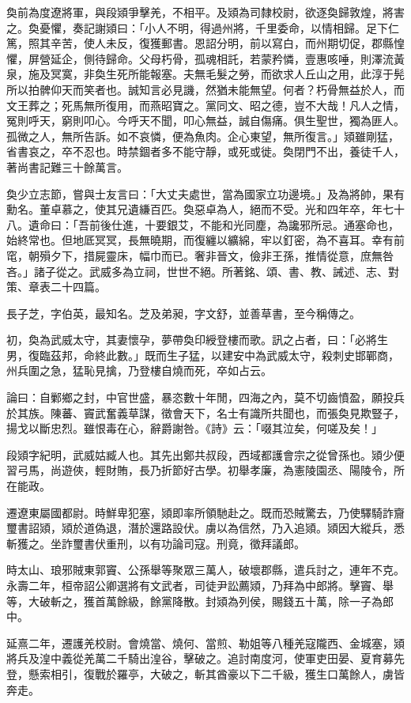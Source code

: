 \begin{pinyinscope}
奐前為度遼將軍，與段熲爭擊羌，不相平。及熲為司隸校尉，欲逐奐歸敦煌，將害之。奐憂懼，奏記謝熲曰：「小人不明，得過州將，千里委命，以情相歸。足下仁篤，照其辛苦，使人未反，復獲郵書。恩詔分明，前以寫白，而州期切促，郡縣惶懼，屏營延企，側待歸命。父母朽骨，孤魂相託，若蒙矜憐，壹惠咳唾，則澤流黃泉，施及冥寞，非奐生死所能報塞。夫無毛髮之勞，而欲求人丘山之用，此淳于髡所以拍髀仰天而笑者也。誠知言必見譏，然猶未能無望。何者？朽骨無益於人，而文王葬之；死馬無所復用，而燕昭寶之。黨同文、昭之德，豈不大哉！凡人之情，冤則呼天，窮則叩心。今呼天不聞，叩心無益，誠自傷痛。俱生聖世，獨為匪人。孤微之人，無所告訴。如不哀憐，便為魚肉。企心東望，無所復言。」熲雖剛猛，省書哀之，卒不忍也。時禁錮者多不能守靜，或死或徙。奐閉門不出，養徒千人，著尚書記難三十餘萬言。

奐少立志節，嘗與士友言曰：「大丈夫處世，當為國家立功邊境。」及為將帥，果有勳名。董卓慕之，使其兄遺縑百匹。奐惡卓為人，絕而不受。光和四年卒，年七十八。遺命曰：「吾前後仕進，十要銀艾，不能和光同塵，為讒邪所忌。通塞命也，始終常也。但地厎冥冥，長無曉期，而復纏以纊綿，牢以釘密，為不喜耳。幸有前窀，朝殞夕下，措屍靈床，幅巾而已。奢非晉文，儉非王孫，推情從意，庶無咎吝。」諸子從之。武威多為立祠，世世不絕。所著銘、頌、書、教、誡述、志、對策、章表二十四篇。

長子芝，字伯英，最知名。芝及弟昶，字文舒，並善草書，至今稱傳之。

初，奐為武威太守，其妻懷孕，夢帶奐印綬登樓而歌。訊之占者，曰：「必將生男，復臨茲邦，命終此數。」既而生子猛，以建安中為武威太守，殺刺史邯鄲商，州兵圍之急，猛恥見擒，乃登樓自燒而死，卒如占云。

論曰：自鄛鄉之封，中官世盛，暴恣數十年閒，四海之內，莫不切齒憤盈，願投兵於其族。陳蕃、竇武奮義草謀，徵會天下，名士有識所共聞也，而張奐見欺豎子，揚戈以斷忠烈。雖恨毒在心，辭爵謝咎。《詩》云：「啜其泣矣，何嗟及矣！」

段熲字紀明，武威姑臧人也。其先出鄭共叔段，西域都護會宗之從曾孫也。熲少便習弓馬，尚遊俠，輕財賄，長乃折節好古學。初舉孝廉，為憲陵園丞、陽陵令，所在能政。

遷遼東屬國都尉。時鮮卑犯塞，熲即率所領馳赴之。既而恐賊驚去，乃使驛騎詐齎璽書詔熲，熲於道偽退，潛於還路設伏。虜以為信然，乃入追熲。熲因大縱兵，悉斬獲之。坐詐璽書伏重刑，以有功論司寇。刑竟，徵拜議郎。

時太山、琅邪賊東郭竇、公孫舉等聚眾三萬人，破壞郡縣，遣兵討之，連年不克。永壽二年，桓帝詔公卿選將有文武者，司徒尹訟薦熲，乃拜為中郎將。擊竇、舉等，大破斬之，獲首萬餘級，餘黨降散。封熲為列侯，賜錢五十萬，除一子為郎中。

延熹二年，遷護羌校尉。會燒當、燒何、當煎、勒姐等八種羌寇隴西、金城塞，熲將兵及湟中義從羌萬二千騎出湟谷，擊破之。追討南度河，使軍吏田晏、夏育募先登，懸索相引，復戰於羅亭，大破之，斬其酋豪以下二千級，獲生口萬餘人，虜皆奔走。


\end{pinyinscope}
